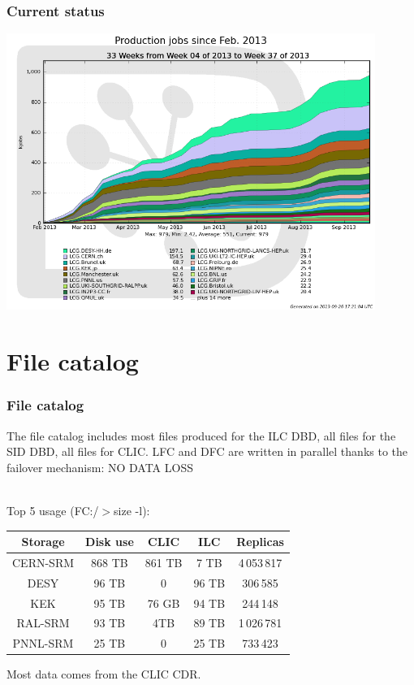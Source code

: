 \documentclass[10pt,table,dvipsnames]{beamer}
\begin{document}
\begin{frame} 
\frametitle{Current status}
\centering
\includegraphics[width=0.9\textwidth]{prodjobs}
\end{frame} 

\section{File catalog}
\begin{frame}
\frametitle{File catalog}
The file catalog includes most files produced for the ILC DBD, all files 
for the SID DBD, all files for CLIC. LFC and DFC are written in parallel
thanks to the failover mechanism: \alert{NO DATA LOSS}

~\\

Top 5 usage {\scriptsize (FC:/$>$size -l)}:\\
\begin{center}
\begin{tabular}{|ccccc|}
\hline
Storage & Disk use & CLIC & ILC & Replicas \\
\hline
CERN-SRM & 868 TB & 861 TB & 7 TB & 4\,053\,817\\
\hline
DESY & 96 TB & 0 & 96 TB& 306\,585\\
\hline
KEK & 95 TB & 76 GB & 94 TB & 244\,148\\
\hline
RAL-SRM & 93 TB & 4TB & 89 TB & 1\,026\,781\\
\hline
PNNL-SRM & 25 TB & 0 & 25 TB & 733\,423\\
\hline
\end{tabular}
\end{center}
Most data comes from the CLIC CDR.

\end{frame}
\end{document}
